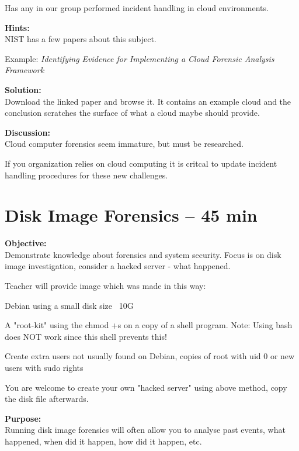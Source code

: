 \documentclass[a4paper,11pt,notitlepage]{report}
\begin{document}
Has any in our group performed incident handling in cloud environments.

{\bf Hints:}\\
NIST has a few papers about this subject.

Example:
\emph{Identifying Evidence for Implementing a Cloud Forensic Analysis Framework}

{\bf Solution:}\\
Download the linked paper and browse it. It contains an example cloud and the conclusion scratches the surface of what a cloud maybe should provide.

{\bf Discussion:}\\
Cloud computer forensics seem immature, but must be researched.

If you organization relies on cloud computing it is critcal to update incident handling procedures for these new challenges.



\chapter{Disk Image Forensics -- 45 min}
\label{ex:disk-image-forensics}

{\bf Objective:}\\
Demonstrate knowledge about forensics and system security. Focus is on disk image investigation, consider a hacked server - what happened.

Teacher will provide image which was made in this way:
\begin{list2}
\item Debian using a small disk size ~10G
\item A "root-kit" using the chmod +s on a copy of a shell program. Note: Using bash does NOT work since this shell prevents this!
\item Create extra users not usually found on Debian, copies of root with uid 0 or new users with sudo rights
\end{list2}

You are welcome to create your own "hacked server" using above method, copy the disk file afterwards.


{\bf Purpose:}\\
Running disk image forensics will often allow you to analyse past events, what happened, when did it happen, how did it happen, etc.
\end{document}
